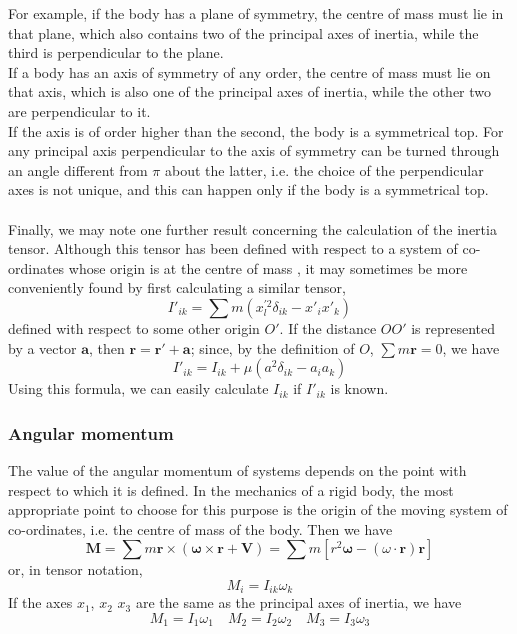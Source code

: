 \documentclass[cyan]{elegantnote}
\begin{document}
For example, if the body has a plane of symmetry, the centre of mass must lie in that plane, which also contains two of the principal axes of inertia, while the third is perpendicular to the plane. \\
If a body has an axis of symmetry of any order, the centre of mass must lie on that axis, which is also one of the principal axes of inertia, while the other two are perpendicular to it. \\
If the axis is of order higher than the second, the body is a symmetrical top. For any principal axis perpendicular to the axis of symmetry can be turned through an angle different from $\pi$ about the latter, i.e. the choice of the perpendicular axes is not unique, and this can happen only if the body is a symmetrical top.\\ \\
Finally, we may note one further result concerning the calculation of the inertia tensor. 
Although this tensor has been defined with respect to a system of co-ordinates whose origin is at the centre of mass , it may sometimes be more conveniently found by first calculating a similar tensor,
\[I'_{ik} = \sum m (x_l^{'2} \delta_{ik} - x'_i x'_k)\]
defined with respect to some other origin $O'$. If the distance $OO'$ is represented by a vector $\bm{a}$, then $\bm{r} = \bm{r'} + \bm{a}$; since, by the definition
of $O$, $\sum m\bm{r} = 0$, we have
\[I'_{ik} = I_{ik} + \mu (a^2\delta_{ik}-a_i a_k)\]
Using this formula, we can easily calculate $I_{ik}$ if $I'_{ik}$ is known.
\subsubsection{Angular momentum}
The value of the angular momentum of systems depends on the point with respect to which it is defined. In the mechanics of a rigid body, the most appropriate point to choose for this purpose is the origin of the moving system of co-ordinates, i.e. the centre of mass of the body. Then we have
\[\bm{M} = \sum m\bm{r} \times (\bm{\omega} \times \bm{r} + \bm{V}) = \sum m \left [ r^2\bm{\omega} - (\omega \cdot \bm{r})\bm{r} \right ]\]
or, in tensor notation,
\[M_i = I_{ik}\omega_k\]
If the axes $x_1$, $x_2$ $x_3$ are the same as the principal axes of inertia, we have
\[M_1 = I_1 \omega_1 \quad M_2 = I_2 \omega_2 \quad M_3 = I_3 \omega_3\]
\end{document}
